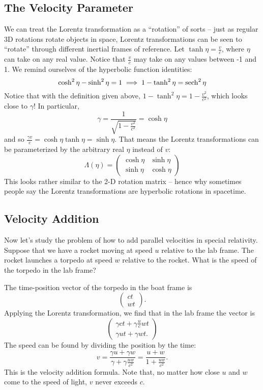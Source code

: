 \subsection*{The Velocity Parameter}
We can treat the Lorentz transformation as a ``rotation'' of sorts -- just as regular 3D rotations rotate objects in space, Lorentz transformations can be seen to ``rotate'' through different inertial frames of reference. Let $\tanh \eta = \frac{v}{c}$, where $\eta$ can take on any real value. Notice that $\frac v c$ may take on any values between -1 and 1. We remind ourselves of the hyperbolic function identities: 
\[
    \cosh^2 \eta- \sinh^2 \eta = 1 \implies 1 - \tanh^2 \eta = \operatorname{sech}^2 \eta 
\]
Notice that with the definition given above, $1 - \tanh^2 \eta = 1 - \frac{v^2}{c^2}$, which looks close to $\gamma$! In particular, 
\[
    \gamma = \frac{1}{\sqrt{1 - \frac{v^2}{c^2}}} = \cosh \eta 
\]
and so $\frac{\gamma v}{c} = \cosh \eta \tanh \eta = \sinh \eta$. That means the Lorentz transformations can be parameterized by the arbitrary real $\eta$ instead of $v$: 
\[
    \Lambda (\eta) = \begin{pmatrix}
        \cosh \eta & \sinh \eta \\ \sinh \eta & \cosh \eta 
    \end{pmatrix}
\]
This looks rather similar to the 2-D rotation matrix -- hence why sometimes people say the Lorentz transformations are hyperbolic rotations in spacetime. 

\subsection*{Velocity Addition}
Now let's study the problem of how to add parallel velocities in special relativity. Suppose that we have a rocket moving at speed $u$ relative to the lab frame. The rocket launches a torpedo at speed $w$ relative to the rocket. What is the speed of the torpedo in the lab frame?

The time-position vector of the torpedo in the boat frame is 
\[\begin{pmatrix}
    ct \\ wt
\end{pmatrix}. \] Applying the Lorentz transformation, we find that in the lab frame the vector is 
\[
\begin{pmatrix}
    \gamma c t + \gamma \frac{u}{c } w t \\
    \gamma u t + \gamma w t.
\end{pmatrix}
\]
The speed can be found by dividing the position by the time:
\[
v = \frac{\gamma u + \gamma w}{\gamma + \gamma \frac{uw}{c^2}} = \frac{u+w}{1+\frac{uw}{c^2}}.
\]
This is the velocity addition formula. Note that, no matter how close $u$ and $w$ come to the speed of light, $v$ never exceeds $c$.
